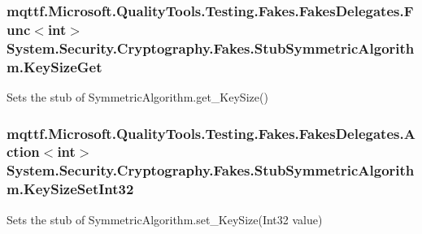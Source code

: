 \hypertarget{class_system_1_1_security_1_1_cryptography_1_1_fakes_1_1_stub_symmetric_algorithm_a31dc5b803b48c6bc2f33ca5ea5019f60}{
\subsubsection[{Key\-Size\-Get}]{\setlength{\rightskip}{0pt plus 5cm}mqttf.\-Microsoft.\-Quality\-Tools.\-Testing.\-Fakes.\-Fakes\-Delegates.\-Func$<$int$>$ System.\-Security.\-Cryptography.\-Fakes.\-Stub\-Symmetric\-Algorithm.\-Key\-Size\-Get}}\label{class_system_1_1_security_1_1_cryptography_1_1_fakes_1_1_stub_symmetric_algorithm_a31dc5b803b48c6bc2f33ca5ea5019f60}


Sets the stub of Symmetric\-Algorithm.\-get\-\_\-\-Key\-Size()

\hypertarget{class_system_1_1_security_1_1_cryptography_1_1_fakes_1_1_stub_symmetric_algorithm_a99ea5dfac9ec33e89a2ed0387e78678a}{
\subsubsection[{Key\-Size\-Set\-Int32}]{\setlength{\rightskip}{0pt plus 5cm}mqttf.\-Microsoft.\-Quality\-Tools.\-Testing.\-Fakes.\-Fakes\-Delegates.\-Action$<$int$>$ System.\-Security.\-Cryptography.\-Fakes.\-Stub\-Symmetric\-Algorithm.\-Key\-Size\-Set\-Int32}}\label{class_system_1_1_security_1_1_cryptography_1_1_fakes_1_1_stub_symmetric_algorithm_a99ea5dfac9ec33e89a2ed0387e78678a}


Sets the stub of Symmetric\-Algorithm.\-set\-\_\-\-Key\-Size(\-Int32 value)

